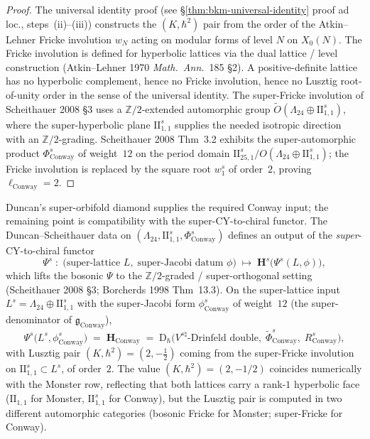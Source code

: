 \begin{proof}
The universal identity proof (see
\S\ref{thm:bkm-universal-identity} proof ad loc., steps~(ii)--(iii))
constructs the $(K,\hbar^2)$ pair from the order of the Atkin--Lehner
Fricke involution $w_N$ acting on modular forms of level $N$ on
$X_0(N)$. The Fricke involution is defined for hyperbolic lattices
via the dual lattice / level construction (Atkin--Lehner 1970
\emph{Math.\ Ann.}~185 \S2). A positive-definite lattice has no
hyperbolic complement, hence no Fricke involution, hence no Lusztig
root-of-unity order in the sense of the universal identity. The
super-Fricke involution of Scheithauer 2008 \S3 uses a
$\mathbb{Z}/2$-extended automorphic group $\widetilde O(\Lambda_{24}
\oplus\mathrm{II}_{1,1}^{s})$, where the super-hyperbolic plane
$\mathrm{II}_{1,1}^{s}$ supplies the needed isotropic direction with
an $\mathbb{Z}/2$-grading. Scheithauer 2008 Thm~3.2 exhibits the
super-automorphic product
$\Phi^{s}_{\mathrm{Conway}}$ of weight~$12$ on the period domain
$\mathrm{II}_{25,1}^{s}/O(\Lambda_{24}\oplus\mathrm{II}_{1,1}^{s})$;
the Fricke involution is replaced by the square root $w_1^{s}$ of
order~$2$, proving $\ell_{\mathrm{Conway}} = 2$.
\end{proof}

\begin{conjecture}
\label{thm:bkm-conway-psi-super-image}
Duncan's super-orbifold diamond supplies the required Conway input;
the remaining point is compatibility with the super-CY-to-chiral
functor.
The Duncan--Scheithauer data on
$(\Lambda_{24},\mathrm{II}_{1,1}^{s},\Phi^{s}_{\mathrm{Conway}})$
defines an output of the \emph{super}-CY-to-chiral functor
\[
 \Psi^{s}
 \;\colon\;
 \bigl(\text{super-lattice }L,\;\text{super-Jacobi datum }\phi\bigr)
 \;\longmapsto\;
 \mathbf{H}^{s}\bigl(\Psi^{s}(L,\phi)\bigr),
\]
which lifts the bosonic $\Psi$ to the
$\mathbb{Z}/2$-graded / super-orthogonal setting
(Scheithauer 2008 \S3; Borcherds 1998 Thm~13.3). On the
super-lattice input
$L^{s} = \Lambda_{24}\oplus\mathrm{II}_{1,1}^{s}$ with the
super-Jacobi form $\phi^{s}_{\mathrm{Conway}}$ of weight~$12$
(the super-denominator of $\mathfrak{g}_{\mathrm{Conway}}$),
\[
 \Psi^{s}\bigl(L^{s},\phi^{s}_{\mathrm{Conway}}\bigr)
 \;=\;
 \mathbf{H}_{\mathrm{Conway}}
 \;=\;
 \mathrm{D}_\hbar\bigl(V^{s\natural}\text{-Drinfeld double},\;
 \widetilde\Phi^{s}_{\mathrm{Conway}},\;
 R^{s}_{\mathrm{Conway}}\bigr),
\]
with Lusztig pair $(K,\hbar^2) = (2,-\tfrac{1}{2})$ coming from the
super-Fricke involution on
$\mathrm{II}_{1,1}^{s}\subset L^{s}$, of order~$2$.
The value $(K,\hbar^2) = (2,-1/2)$ coincides numerically with the
Monster row, reflecting that both lattices carry a rank-$1$
hyperbolic face ($\mathrm{II}_{1,1}$ for Monster,
$\mathrm{II}_{1,1}^{s}$ for Conway), but the Lusztig pair is
computed in two different automorphic categories
(bosonic Fricke for Monster; super-Fricke for Conway).
\end{conjecture}

